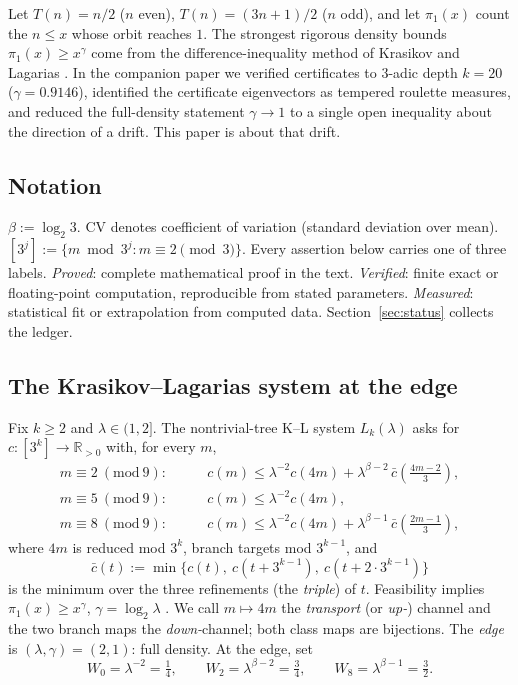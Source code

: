\documentclass[11pt]{article}
\theoremstyle{definition}
\theoremstyle{remark}
\newcommand{\R}{\mathbb{R}}
\newcommand{\CV}{\mathrm{CV}}
\newcommand{\lam}{\lambda}
\newcommand{\gam}{\gamma}
\newcommand{\bet}{\beta}
\begin{document}
Let $T(n) = n/2$ ($n$ even), $T(n) = (3n+1)/2$ ($n$ odd), and let
$\pi_1(x)$ count the $n \leq x$ whose orbit reaches $1$. The strongest
rigorous density bounds $\pi_1(x) \geq x^{\gam}$ come from the
difference-inequality method of Krasikov and Lagarias \cite{KL03}. In the
companion paper \cite{Temp26} we verified certificates to $3$-adic depth
$k = 20$ ($\gam = 0.9146$), identified the certificate eigenvectors as
tempered roulette measures, and reduced the full-density statement
$\gam \to 1$ to a single open inequality about the direction of a drift.
This paper is about that drift.

\subsection*{Notation}
$\bet := \log_2 3$. $\CV$ denotes coefficient of variation (standard
deviation over mean). $[3^j] := \{ m \bmod 3^j : m \equiv 2 \pmod 3 \}$.
Every assertion below carries one of three labels. \emph{Proved}: complete
mathematical proof in the text. \emph{Verified}: finite exact or
floating-point computation, reproducible from stated parameters.
\emph{Measured}: statistical fit or extrapolation from computed data.
Section~\ref{sec:status} collects the ledger.

\subsection{The Krasikov--Lagarias system at the edge}

Fix $k \geq 2$ and $\lam \in (1,2]$. The nontrivial-tree K--L system
$L_k(\lam)$ asks for $c : [3^k] \to \R_{>0}$ with, for every $m$,
\begin{align}
m \equiv 2 \ (\mathrm{mod}\ 9): &\qquad
c(m) \leq \lam^{-2} c(4m) + \lam^{\bet-2}\, \bar c\!\left(\tfrac{4m-2}{3}\right),
\label{eq:L1}\\
m \equiv 5 \ (\mathrm{mod}\ 9): &\qquad
c(m) \leq \lam^{-2} c(4m),
\label{eq:L2}\\
m \equiv 8 \ (\mathrm{mod}\ 9): &\qquad
c(m) \leq \lam^{-2} c(4m) + \lam^{\bet-1}\, \bar c\!\left(\tfrac{2m-1}{3}\right),
\label{eq:L3}
\end{align}
where $4m$ is reduced mod $3^k$, branch targets mod $3^{k-1}$, and
\begin{equation}
\bar c(t) := \min\{ c(t),\ c(t + 3^{k-1}),\ c(t + 2 \cdot 3^{k-1}) \}
\label{eq:min}
\end{equation}
is the minimum over the three refinements (the \emph{triple}) of $t$.
Feasibility implies $\pi_1(x) \geq x^{\gam}$, $\gam = \log_2 \lam$
\cite{KL03}. We call $m \mapsto 4m$ the \emph{transport} (or
\emph{up-}) channel and the two branch maps the \emph{down-}channel;
both class maps are bijections. The \emph{edge} is
$(\lam, \gam) = (2, 1)$: full density. At the edge, set
\begin{equation}
W_0 = \lam^{-2} = \tfrac14, \qquad
W_2 = \lam^{\bet - 2} = \tfrac34, \qquad
W_8 = \lam^{\bet - 1} = \tfrac32 .
\label{eq:weights}
\end{equation}
\end{document}
